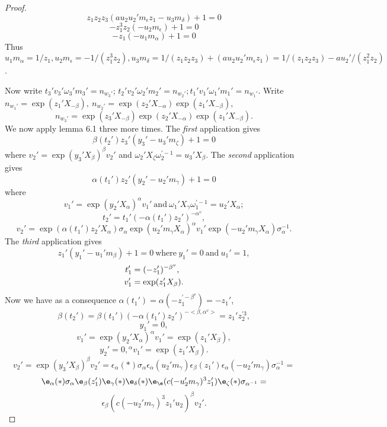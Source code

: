 \documentclass{memo-l}
\theoremstyle{definition}
\theoremstyle{remark}
\numberwithin{section}{chapter}
\numberwithin{equation}{chapter}
\begin{document}
\begin{proof}
$$z_{1}z_{2}z_{3}(au_{2}u_{2}'m_{{\epsilon}}z_{1}-u_{3}m_{{\delta}})+1 = 0$$
$$
-z_{1}^{3}z_{2}(-u_{2}m_{{\epsilon}})+1 = 0
$$
$$
-z_{1}(-u_{1}m_{{\alpha}})+1 = 0
$$
Thus $u_{1}m_{{\alpha}}=1/z_{1}, u_{2}m_{{\epsilon}}=-1/(z_{1}^{3}z_{2}), 
u_{3}m_{{\delta}}=1/(z_{1}z_{2}z_{3}) + (au_{2}u_{2}'m_{{\epsilon}}z_{1}) 
= 1/(z_{1}z_{2}z_{3}) - au_{2}'/(z_{1}^{2}z_{2})$.

Now write $t_{3}'v_{3}'{\omega}_{3}'m_{3}' = n_{w_3'}$; 
$t_{2}'v_{2}'{\omega}_{2}'m_{2}' = n_{w_2'}; 
t_{1}'v_{1}'{\omega}_{1}'m_{1}' = n_{w_1'}$. 
 Write $n_{w_1'} = \exp(z_{1}'X_{-{\beta}}), \ 
n_{w_2'} = \exp(z_{2}'X_{-{\alpha}})
\exp(z_{1}'X_{-{\beta}})$, $$n_{w_3'} = 
\exp(z_{3}'X_{-{\beta}})\exp(z_{2}'X_{-{\alpha}})\exp(z_{1}'X_{-{\beta}}).$$ 
 We now apply lemma 6.1 three more times. 
 The {\it first}  application gives
$$
{\beta}(t_{2}')z_{3}'(y_{3}'-u_{3}'m_{{\zeta}})+1 = 0
$$ 
where $v_{2}' = \exp(y_{3}'X_{{\beta}})^{{\beta}}v_{2}'$ and 
${\omega}_{2}'X_{{\zeta}}{\omega}_{2}^{\prime-1}=u_{3}'X_{{\beta}}$. 
 The {\it second}  application gives
$$
{\alpha}(t_{1}')z_{2}'(y_{2}'-u_{2}'m_{{\gamma}})+1 = 0
$$ 
where 
$$
v_{1}' = \exp(y_{2}'X_{{\alpha}})^{{\alpha}}v_{1}'\ {\text{and}}\ 
{\omega}_{1}'X_{{\gamma}}{\omega}_{1}^{\prime-1}=u_{2}'X_{{\alpha}};
$$
$$
t_{2}' = t_{1}'(-{\alpha}(t_{1}')z_{2}')^{-\alpha^v} ,
$$ 
$$
v_{2}' = \exp({\alpha}(t_{1}')z_{2}'X_{{\alpha}}){\sigma}_{{\alpha}}
\exp(u_{2}'m_{{\gamma}}X_{{\alpha}})^{{\alpha}}v_{1}'
\exp(-u_{2}'m_{{\gamma}}X_{{\alpha}}){\sigma}_{{\alpha}}^{-1}.
$$
The {\it third}  application gives
$$
z_{1}'(y_{1}'-u_{1}'m_{{\beta}})+1 = 0\ {\text{where}}\ 
y_{1}' = 0\  {\text{and}}\ u_{1}' = 1,
$$
$$
\aligned
t_{1}' &= (-z_1')^{-\beta^v} ,\\
v_{1}' &= \exp(z_{1}'X_{{\beta}}) .
\endaligned
$$
Now we have as a consequence ${\alpha}(t_{1}') = 
{\alpha}(-z_{1}^{\prime-\beta^v}) = -z_{1}'$,
$$
\beta(t_{2}') = {\beta}(t_{1}')(-{\alpha}(t_{1}')z_{2}')^{-<\beta,\alpha^v>}
= z_{1}'z_{2}^{\prime3},
$$
$$
y_{1}'= 0,
$$
$$
v_{1}' = \exp(y_{2}'X_{{\alpha}})^{{\alpha}}v_{1}' = \exp(z_{1}'X_{{\beta}}),
$$
$$
y_{2}' = 0, {}^\alpha v_{1}' = \exp(z_{1}'X_{{\beta}}).
$$
$$
v_{2}' = \exp(y_{3}'X_{{\beta}})^{{\beta}}v_{2}' = {\epsilon}_{{\alpha}}(*)
{\sigma}_{{\alpha}}{\epsilon}_{{\alpha}}(u_{2}'m_{{\gamma}})
{\epsilon}_{{\beta}}(z_{1}'){\epsilon}_{{\alpha}}
(-u_{2}'m_{{\gamma}}){\sigma}_{{\alpha}}^{-1} = 
$$
%
$$
\e_{{\alpha}}(*){\sigma}_{\alpha}\e_\beta(z_{1}')
{\e}_\gamma(*)\e_\delta(*)\e_\e(c(-u_{2}'m_{{\gamma}})^{3}z_{1}')
\e_\zeta(*) {\sigma}_{\alpha^{-1}} =
$$
$$
{\epsilon}_{{\beta}}(c(-u_{2}'m_{{\gamma}})^{3}z_{1}'u_{2})^{{\beta}}v_{2}'.
$$
\end{proof}
\end{document}
